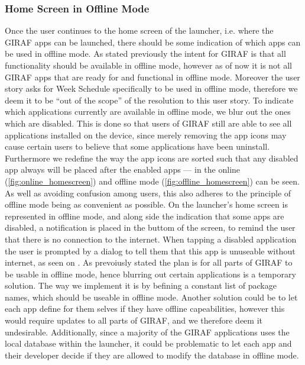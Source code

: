 \subsubsection{Home Screen in Offline Mode}
Once the user continues to the home screen of the launcher, i.e. where the GIRAF apps can be launched, there should be some indication of which apps can be used in offline mode. 
As stated previously the intent for GIRAF is that all functionality should be available in offline mode, however as of now it is not all GIRAF apps that are ready for and functional in offline mode.
Moreover the user story asks for Week Schedule specifically to be used in offline mode, therefore we deem it to be \enquote{out of the scope} of the resolution to this user story.
To indicate which applications currently are available in offline mode, we blur out the ones which are disabled.
This is done so that users of GIRAF still are able to see all applications installed on the device, since merely removing the app icons may cause certain users to believe that some applications have been uninstall.
Furthermore we redefine the way the app icons are sorted such that any disabled app always will be placed after the enabled apps --- in  the online (\ref{fig:online_homescreen}) and offline mode (\ref{fig:offline_homescreen}) can be seen.
As well as avoiding confusion among users, this also adheres to the principle of offline mode being as convenient as possible.
On  the launcher's home screen is represented in offline mode, and along side the indication that some apps are disabled, a notification is placed in the buttom of the screen, to remind the user that there is no connection to the internet.
When tapping a disabled application the user is prompted by a dialog to tell them that this app is unuseable without internet, as seen on . 
As prevoiusly stated the plan is for all parts of GIRAF to be usable in offline mode, hence blurring out certain applications is a temporary solution.
The way we implement it is by befining a constant list of package names, which should be useable in offline mode.
Another solution could be to let each app define for them selves if they have offline capeabilities, however this would require updates to all parts of GIRAF, and we therefore deem it undesirable.
Additionally, since a majority of the GIRAF applications uses the local database within the launcher, it could be problematic to let each app and their developer decide if they are allowed to modify the database in offline mode.


